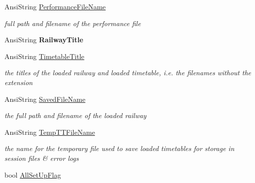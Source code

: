 \begin{DoxyCompactItemize}
\mbox{\label{class_t_interface_ad2034cd16714b8adf3b848b11e351372}} 
Ansi\+String \mbox{\hyperlink{class_t_interface_ad2034cd16714b8adf3b848b11e351372}{Performance\+File\+Name}}
\begin{DoxyCompactList}\small\item\em full path and filename of the performance file \end{DoxyCompactList}\item 
\mbox{\label{class_t_interface_a1757555f54523042b60c6d3368618de9}} 
Ansi\+String {\bfseries Railway\+Title}
\item 
\mbox{\label{class_t_interface_a72fb1bacb9a5269ac056c4fdaa18d8ed}} 
Ansi\+String \mbox{\hyperlink{class_t_interface_a72fb1bacb9a5269ac056c4fdaa18d8ed}{Timetable\+Title}}
\begin{DoxyCompactList}\small\item\em the titles of the loaded railway and loaded timetable, i.\+e. the filenames without the extension \end{DoxyCompactList}\item 
\mbox{\label{class_t_interface_a60348633bd6ea6343cd007ec2d44018b}} 
Ansi\+String \mbox{\hyperlink{class_t_interface_a60348633bd6ea6343cd007ec2d44018b}{Saved\+File\+Name}}
\begin{DoxyCompactList}\small\item\em the full path and filename of the loaded railway \end{DoxyCompactList}\item 
\mbox{\label{class_t_interface_a7c3d3ebc09238e1182d0f3f216c90097}} 
Ansi\+String \mbox{\hyperlink{class_t_interface_a7c3d3ebc09238e1182d0f3f216c90097}{Temp\+T\+T\+File\+Name}}
\begin{DoxyCompactList}\small\item\em the name for the temporary file used to save loaded timetables for storage in session files \& error logs \end{DoxyCompactList}\item 
\mbox{\label{class_t_interface_ac8f8c094fa7a90ea7c0a1c06dc8d4257}} 
bool \mbox{\hyperlink{class_t_interface_ac8f8c094fa7a90ea7c0a1c06dc8d4257}{All\+Set\+Up\+Flag}}

\end{DoxyCompactItemize}
